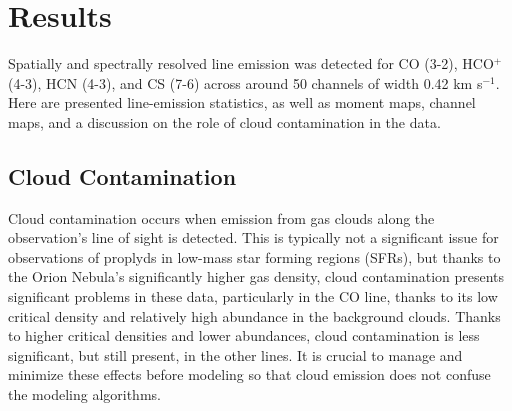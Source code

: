 \chapter{Results}
\label{chap:results}


Spatially and spectrally resolved line emission was detected for CO (3-2), HCO$^{+}$ (4-3), HCN (4-3), and CS (7-6) across around 50 channels of width 0.42 km s$^{-1}$. Here are presented line-emission statistics, as well as moment maps, channel maps, and a discussion on the role of cloud contamination in the data.


\bigskip

\section{Cloud Contamination}
\label{section:cloud_contamination}

Cloud contamination occurs when emission from gas clouds along the observation's line of sight is detected. This is typically not a significant issue for observations of proplyds in low-mass star forming regions (SFRs), but thanks to the Orion Nebula's significantly higher gas density, cloud contamination presents significant problems in these data, particularly in the CO line, thanks to its low critical density and relatively high abundance in the background clouds. Thanks to higher critical densities and lower abundances, cloud contamination is less significant, but still present, in the other lines. It is crucial to manage and minimize these effects before modeling so that cloud emission does not confuse the modeling algorithms.

\bigskip

